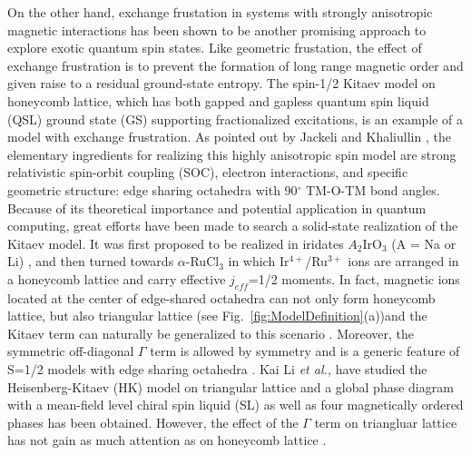 \documentclass[aps,prb,reprint,amsfonts,amsmath,amssymb,showpacs,groupedaddress,superscriptaddress]{revtex4-1}
\begin{document}
On the other hand, exchange frustation in systems with strongly anisotropic magnetic interactions has been shown to be another promising approach to explore exotic quantum spin states. Like geometric frustation, the effect of exchange frustration is to prevent the formation of long range magnetic order and given raise to a residual ground-state entropy. The spin-1/2 Kitaev model \cite{Kitaev2006} on honeycomb lattice, which has both gapped and gapless quantum spin liquid (QSL) ground state (GS) supporting fractionalized excitations, is an example of a model with exchange frustration. As pointed out by Jackeli and Khaliullin \cite{Khaliullin2005, PhysRevLett.102.017205}, the elementary ingredients for realizing this highly anisotropic spin model are strong relativistic spin-orbit coupling (SOC), electron interactions, and specific geometric structure: edge sharing octahedra with 90$^\circ$ TM-O-TM bond angles. Because of its theoretical importance and potential application in quantum computing, great efforts have been made to search a solid-state realization of the Kitaev model. It was first proposed to be realized in iridates $A_2$IrO$_3$ (A = Na or Li) \cite{PhysRevLett.105.027204,PhysRevLett.108.127204,Chun2015,PhysRevLett.110.076402,PhysRevB.87.220407,PhysRevLett.110.097204,PhysRevLett.108.127203,PhysRevB.92.024413,PhysRevLett.112.077204,Rau2014}, and then turned towards $\alpha$-RuCl$_3$ \cite{PhysRevB.91.180401,Banerjee2016,PhysRevB.92.235119,PhysRevB.94.161106,PhysRevB.93.214431,PhysRevLett.118.107203,PhysRevLett.118.107203,PhysRevB.96.115103} in which Ir$^{4+}$/Ru$^{3+}$ ions are arranged in a honeycomb lattice and carry effective $j_{eff}$=1/2 moments. In fact, magnetic ions located at the center of edge-shared octahedra can not only form honeycomb lattice, but also triangular lattice (see Fig.~\ref{fig:ModelDefinition}(a))and the Kitaev term can naturally be generalized to this scenario \cite{PhysRevB.93.104417,PhysRevB.89.014414}. Moreover, the symmetric off-diagonal $\Gamma$ term is allowed by symmetry and is a generic feature of S=1/2 models with edge sharing octahedra \cite {PhysRevLett.112.077204}. Kai Li \emph{et al.,} \cite{KaiLi2015} have studied the Heisenberg-Kitaev (HK) model on triangular lattice and a global phase diagram with a mean-field level chiral spin liquid (SL) as well as four magnetically ordered phases has been obtained. However, the effect of the $\Gamma$ term on triangluar lattice has not gain as much attention as on honeycomb lattice \cite{PhysRevLett.112.077204,Rau2014,PhysRevLett.118.107203,PhysRevB.96.115103,PhysRevB.93.214431,PhysRevB.100.144422}.
\end{document}
